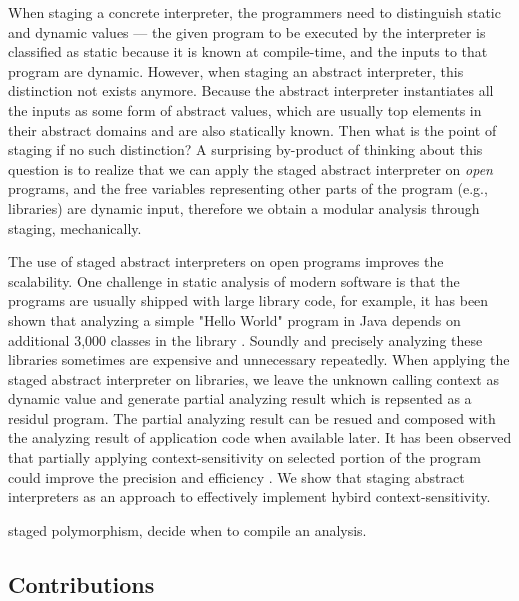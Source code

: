 When staging a concrete interpreter, the programmers need to distinguish 
static and dynamic values --- the given program to be executed by the 
interpreter is classified as static because it is known at compile-time, 
and the inputs to that program are dynamic.  However, when staging an 
abstract interpreter, this distinction not exists anymore. Because the 
abstract interpreter instantiates all the inputs as some form of abstract 
values, which are usually top elements in their abstract domains and are 
also statically known. Then what is the point of staging if no such distinction?
A surprising by-product of thinking about this question is to realize that 
we can apply the staged abstract interpreter on \textit{open} programs, and
the free variables representing other parts of the program (e.g., libraries) 
are dynamic input, therefore we obtain a modular analysis through staging, 
mechanically. 

The use of staged abstract interpreters on open programs improves the scalability.
One challenge in static analysis of modern software is that the programs are usually 
shipped with large library code, for example, it has been shown that analyzing a simple
"Hello World" program in Java depends on additional 3,000 classes in the library \cite{DBLP:conf/oopsla/KulkarniMZN16}.
Soundly and precisely analyzing these libraries sometimes are expensive and unnecessary repeatedly.
When applying the staged abstract interpreter on libraries, we leave the unknown 
calling context as dynamic value and generate partial analyzing result which is 
repsented as a residul program. The partial analyzing result can be resued and composed
with the analyzing result of application code when available later. 
It has been observed that partially applying context-sensitivity on selected portion of the program could
improve the precision and efficiency \cite{zipper2018, Kastrinis:2013:HCP:2491956.2462191}. 
We show that staging abstract interpreters as an approach to effectively implement hybird context-sensitivity\todo{}.

staged polymorphism, decide when to compile an analysis.  

\subsection{Contributions}

